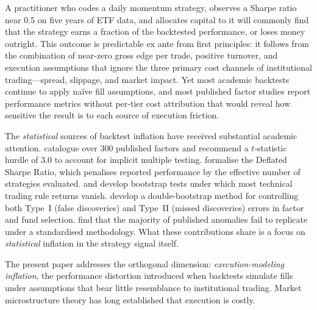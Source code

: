 \documentclass[12pt]{article}
\begin{document}
A practitioner who codes a daily momentum strategy, observes a Sharpe
ratio near 0.5 on five years of ETF data, and allocates capital to it
will commonly find that the strategy earns a fraction of the backtested
performance, or loses money outright. This outcome is predictable
ex ante from first principles: it follows from the combination of
near-zero gross edge per trade, positive turnover, and execution
assumptions that ignore the three primary cost channels of institutional
trading---spread, slippage, and market impact. Yet most academic
backtests continue to apply na\"{i}ve fill assumptions, and most
published factor studies report performance metrics without per-tier
cost attribution that would reveal how sensitive the result is to each
source of execution friction.

The \emph{statistical} sources of backtest inflation have received
substantial academic attention. \citet{harvey2016and} catalogue over
300 published factors and recommend a $t$-statistic hurdle of 3.0 to
account for implicit multiple testing. \citet{bailey2014deflated}
formalise the Deflated Sharpe Ratio, which penalises reported
performance by the effective number of strategies evaluated.
\citet{white2000reality} and \citet{sullivan1999data} develop bootstrap
tests under which most technical trading rule returns vanish.
\citet{harvey2020false} develop a double-bootstrap method for
controlling both Type~I (false discoveries) and Type~II (missed
discoveries) errors in factor and fund selection. \citet{hou2020replicating} find that the
majority of published anomalies fail to replicate under a standardised
methodology. What these contributions share is a focus on
\emph{statistical} inflation in the strategy signal itself.

The present paper addresses the orthogonal dimension:
\emph{execution-modeling inflation}, the performance distortion
introduced when backtests simulate fills under assumptions that bear
little resemblance to institutional trading. Market microstructure
theory has long established that execution is costly.
\end{document}
